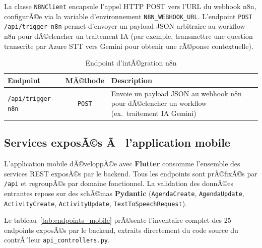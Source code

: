 La classe \texttt{N8NClient} encapsule l'appel HTTP POST vers
l'URL du webhook n8n, configurÃ©e via la variable d'environnement
\texttt{N8N\_WEBHOOK\_URL}. L'endpoint
\texttt{POST /api/trigger-n8n} permet d'envoyer un payload JSON
arbitraire au workflow n8n pour dÃ©clencher un traitement IA
(par exemple, transmettre une question transcrite par Azure STT
vers Gemini pour obtenir une rÃ©ponse contextuelle).

\begin{table}[H]
\centering
\caption{Endpoint d'intÃ©gration n8n}
\label{tab:endpoints_n8n}
\renewcommand{\arraystretch}{1.3}
\begin{tabular}{|l|c|p{7cm}|}
\hline
\textbf{Endpoint} & \textbf{MÃ©thode} & \textbf{Description} \\
\hline
\texttt{/api/trigger-n8n} & \texttt{POST}
  & Envoie un payload JSON au webhook n8n pour dÃ©clencher
    un workflow (ex.\ traitement IA Gemini) \\
\hline
\end{tabular}
\end{table}

\subsection{Services exposÃ©s Ã  l'application mobile}

L'application mobile dÃ©veloppÃ©e avec \textbf{Flutter} consomme
l'ensemble des services REST exposÃ©s par le backend. Tous les
endpoints sont prÃ©fixÃ©s par \texttt{/api} et regroupÃ©s par
domaine fonctionnel. La validation des donnÃ©es entrantes repose
sur des schÃ©mas \textbf{Pydantic} (\texttt{AgendaCreate},
\texttt{AgendaUpdate}, \texttt{ActivityCreate},
\texttt{ActivityUpdate}, \texttt{TextToSpeechRequest}).

Le tableau~\ref{tab:endpoints_mobile} prÃ©sente l'inventaire
complet des 25 endpoints exposÃ©s par le backend, extraits
directement du code source du contrÃ´leur
\texttt{api\_controllers.py}.

